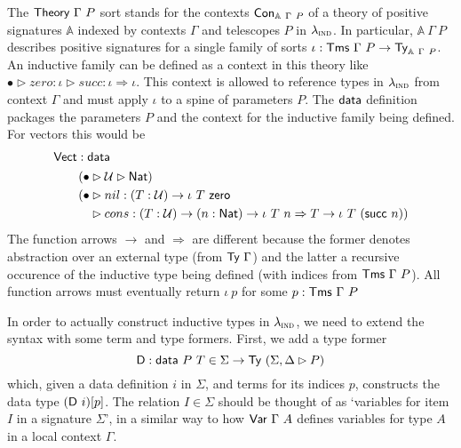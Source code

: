 The $\textsf{Theory}\ \Gamma\ P$ sort stands for the contexts $\textsf{Con}_{\mathbb{A}\ \Gamma\
		P}$ of a theory of positive signatures \cite{Kovacs2023-gq} $\mathbb{A}$ indexed
by contexts $\Gamma$ and telescopes $P$ in $\lambda_{\textsc{ind}}$. In particular,
$\mathbb{A}\ \Gamma\ P$ describes positive signatures for a single family of
sorts $\iota : \Tms\ \Gamma\ P \to \Ty_{\mathbb{A}\ \Gamma\ P}$. An inductive
family can be defined as a context in this theory like $\bullet \rhd zero :
	\iota \rhd succ:\iota \Rightarrow \iota$. This context is allowed to reference
types in $\lambda_{\textsc{ind}}$ from context $\Gamma$ and must apply $\iota$ to a spine of
parameters $P$. The $\textsf{data}$ definition packages the parameters $P$ and the
context for the inductive family being defined. For vectors this would be
\begin{align*}
	 & \mta{Vect} : \mta{data}                                                                                                        \\
	 & \quad\begin{aligned}
		        \quad (\bullet & \rhd\univ \rhd \mta{Nat})\                                                                               \\
		        \quad (\bullet & \rhd nil : (T : \univ) \to \iota\ T\ \mta{zero}                                                          \\
		        \quad          & \rhd cons : (T : \univ) \to (n : \mta{Nat}) \to \iota\ T\ n \Rightarrow T \to \iota\ T\ (\mta{succ}\ n))
	        \end{aligned}
\end{align*}
The function arrows $\to$ and $\Rightarrow$ are different because the former
denotes abstraction over an external type (from $\textsf{Ty}\ \Gamma$) and the latter a
recursive occurence of the inductive type being defined (with indices from
$\textsf{Tms}\ \Gamma\ P$). All function arrows must eventually return $\iota\ p$ for
some $p : \textsf{Tms}\ \Gamma\ P$


In order to actually construct inductive types in $\lambda_{\textsc{ind}}$, we need to
extend the syntax with some term and type formers. First, we add a type former
\[
	\mta{D} : \mta{data}\ P\ T \in \Sigma \to \Ty\ (\Sigma, \Delta \rhd P)
\]
which, given a data definition $i$ in $\Sigma$, and terms for its
indices $p$, constructs the data type $(\mta{D}\ i)[p]$. The relation $I \in
	\Sigma$ should be thought of as `variables for item $I$ in a signature
$\Sigma$', in a similar way to how $\mta{Var}\ \Gamma\ A$ defines variables for
type $A$ in a local context $\Gamma$.


